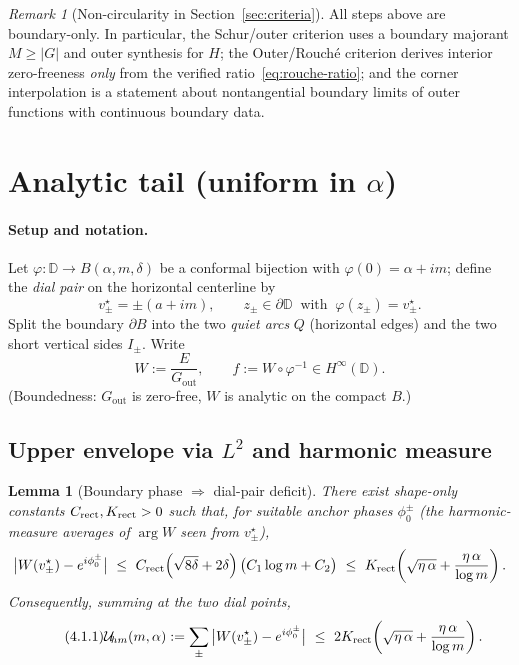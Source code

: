 \documentclass[11pt]{article}
\numberwithin{equation}{section}
\newtheorem{lemma}[theorem]{Lemma}
\theoremstyle{remark}
\newtheorem{remark}[theorem]{Remark}
\newcommand{\D}{\mathbb{D}}
\newcommand{\Gout}{G_{\mathrm{out}}}
\begin{document}
\begin{remark}[Non-circularity in Section~\ref{sec:criteria}]
All steps above are boundary-only. In particular, the Schur/outer criterion uses a boundary majorant $M\ge|G|$ and outer synthesis for $H$; the Outer/Rouch\'e criterion derives interior zero-freeness \emph{only} from the verified ratio~\eqref{eq:rouche-ratio}; and the corner interpolation is a statement about nontangential boundary limits of outer functions with continuous boundary data.
\end{remark}

\section{Analytic tail (uniform in \texorpdfstring{$\alpha$}{alpha})}\label{sec:tail}

\paragraph{Setup and notation.}
Let $\varphi:\D\to B(\alpha,m,\delta)$ be a conformal bijection with $\varphi(0)=\alpha+im$; define the \emph{dial pair} on the horizontal centerline by
\[
v_\pm^\star=\pm(a+im),\qquad z_\pm\in\partial\D\ \text{ with }\ \varphi(z_\pm)=v_\pm^\star.
\]
Split the boundary $\partial B$ into the two \emph{quiet arcs} $Q$ (horizontal edges) and the two short vertical sides $I_\pm$.
Write
\[
W:=\frac{E}{\Gout},\qquad f:=W\circ\varphi^{-1}\in H^\infty(\D).
\]
(Boundedness: $\Gout$ is zero-free, $W$ is analytic on the compact $B$.)

\subsection{Upper envelope via $L^2$ and harmonic measure}\label{subsec:upper}

\begin{lemma}[Boundary phase $\Rightarrow$ dial-pair deficit]\label{lem:upper-envelope}
There exist \emph{shape-only} constants $C_{\rm rect},K_{\rm rect}>0$ such that, for suitable anchor phases $\phi_0^\pm$ (the harmonic-measure averages of $\arg W$ seen from $v_\pm^\star$),
\begin{equation}\label{eq:upper-point}
\big|W(v_\pm^\star)-e^{i\phi_0^\pm}\big|
\ \le\ C_{\rm rect}\Big(\sqrt{8\delta}+2\delta\Big)\,\big(C_1\log m+C_2\big)
\ \le\ K_{\rm rect}\!\left(\sqrt{\eta\,\alpha}+\frac{\eta\,\alpha}{\log m}\right).
\end{equation}
Consequently, summing at the two dial points,
\begin{equation}\tag{4.1.1}\label{eq:Uhm}
\mathcal{U}_{\!hm}(m,\alpha)
:=\sum_{\pm}\big|W(v_\pm^\star)-e^{i\phi_0^\pm}\big|
\ \le\ 2K_{\rm rect}\!\left(\sqrt{\eta\,\alpha}+\frac{\eta\,\alpha}{\log m}\right).
\end{equation}
\end{lemma}
\end{document}

